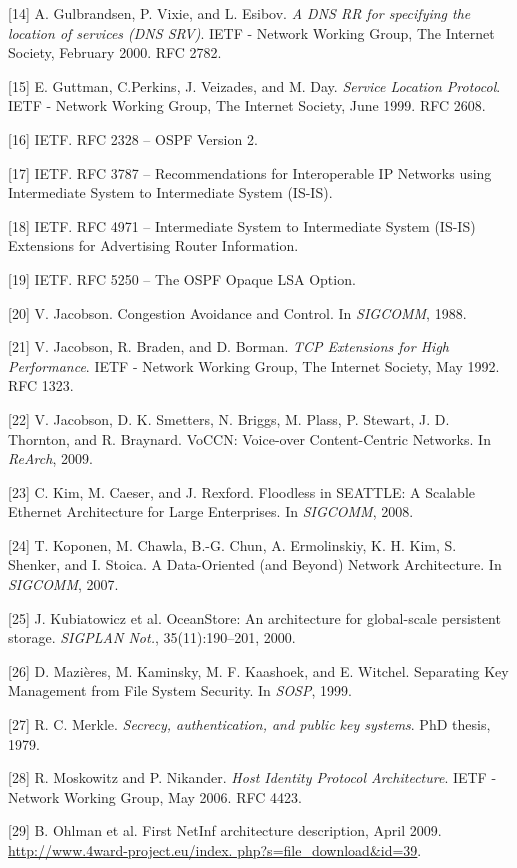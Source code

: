 [14] A. Gulbrandsen, P. Vixie, and L. Esibov. \emph{A DNS RR for specifying the location of services (DNS SRV)}. IETF - Network Working Group, The Internet Society, February 2000. RFC 2782.

[15] E. Guttman, C.Perkins, J. Veizades, and M. Day. \emph{Service Location Protocol}. IETF - Network Working Group, The Internet Society, June 1999. RFC 2608.

[16] IETF. RFC 2328 – OSPF Version 2.

[17] IETF. RFC 3787 – Recommendations for Interoperable IP
Networks using Intermediate System to Intermediate System (IS-IS).

[18] IETF. RFC 4971 – Intermediate System to Intermediate System (IS-IS) Extensions for Advertising Router Information.

[19] IETF. RFC 5250 – The OSPF Opaque LSA Option.

[20] V. Jacobson. Congestion Avoidance and Control. In
\emph{SIGCOMM}, 1988.

[21] V. Jacobson, R. Braden, and D. Borman. \emph{TCP Extensions for
High Performance}. IETF - Network Working Group, The
Internet Society, May 1992. RFC 1323.

[22] V. Jacobson, D. K. Smetters, N. Briggs, M. Plass, P. Stewart,
J. D. Thornton, and R. Braynard. VoCCN: Voice-over
Content-Centric Networks. In \emph{ReArch}, 2009.

[23] C. Kim, M. Caeser, and J. Rexford. Floodless in SEATTLE:
A Scalable Ethernet Architecture for Large Enterprises. In
\emph{SIGCOMM}, 2008.

[24] T. Koponen, M. Chawla, B.-G. Chun, A. Ermolinskiy, K. H.
Kim, S. Shenker, and I. Stoica. A Data-Oriented (and
Beyond) Network Architecture. In \emph{SIGCOMM}, 2007.

[25] J. Kubiatowicz et al. OceanStore: An architecture for
global-scale persistent storage. \emph{SIGPLAN Not.},
35(11):190–201, 2000.

[26] D. Mazières, M. Kaminsky, M. F. Kaashoek, and E. Witchel.
Separating Key Management from File System Security. In
\emph{SOSP}, 1999.

[27] R. C. Merkle. \emph{Secrecy, authentication, and public key
systems}. PhD thesis, 1979.

[28] R. Moskowitz and P. Nikander. \emph{Host Identity Protocol
Architecture}. IETF - Network Working Group, May 2006.
RFC 4423.

[29] B. Ohlman et al. First NetInf architecture description, April
2009. \url{http://www.4ward-project.eu/index.
php?s=file_download&id=39}.

